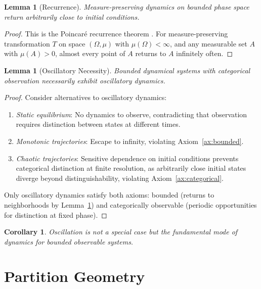 \documentclass[10pt,twocolumn]{article}
\theoremstyle{plain}
\newtheorem{lemma}[theorem]{Lemma}
\newtheorem{corollary}[theorem]{Corollary}
\theoremstyle{definition}
\theoremstyle{remark}
\begin{document}
\begin{lemma}[Recurrence]
\label{lem:recurrence}
Measure-preserving dynamics on bounded phase space return arbitrarily close to initial conditions.
\end{lemma}

\begin{proof}
This is the Poincar\'{e} recurrence theorem \citep{poincare1890}. For measure-preserving transformation $T$ on space $(\Omega, \mu)$ with $\mu(\Omega) < \infty$, and any measurable set $A$ with $\mu(A) > 0$, almost every point of $A$ returns to $A$ infinitely often.
\end{proof}

\begin{lemma}[Oscillatory Necessity]
\label{lem:oscillatory}
Bounded dynamical systems with categorical observation necessarily exhibit oscillatory dynamics.
\end{lemma}

\begin{proof}
Consider alternatives to oscillatory dynamics:
\begin{enumerate}[label=(\roman*)]
\item \emph{Static equilibrium}: No dynamics to observe, contradicting that observation requires distinction between states at different times.
\item \emph{Monotonic trajectories}: Escape to infinity, violating Axiom~\ref{ax:bounded}.
\item \emph{Chaotic trajectories}: Sensitive dependence on initial conditions prevents categorical distinction at finite resolution, as arbitrarily close initial states diverge beyond distinguishability, violating Axiom~\ref{ax:categorical}.
\end{enumerate}
Only oscillatory dynamics satisfy both axioms: bounded (returns to neighborhoods by Lemma~\ref{lem:recurrence}) and categorically observable (periodic opportunities for distinction at fixed phase).
\end{proof}

\begin{corollary}
\label{cor:oscillation_fundamental}
Oscillation is not a special case but the fundamental mode of dynamics for bounded observable systems.
\end{corollary}

\section{Partition Geometry}
\label{sec:partition}
\end{document}

